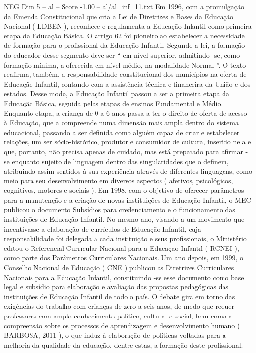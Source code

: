 \begin{textsample}{NEG Dim 5 – al – Score -1.00 – al/al\_inf\_11.txt}
Em 1996, com a promulgação da Emenda Constitucional que cria a Lei de Diretrizes e Bases da Educação Nacional ( LDBEN ), reconhece e regulamenta a Educação Infantil como primeira etapa da Educação Básica.
O artigo 62 foi pioneiro ao estabelecer a necessidade de formação para o profissional da Educação Infantil.
Segundo a lei, a formação do educador desse segmento deve ser “ em nível superior, admitindo -se, como formação mínima, a oferecida em nível médio, na modalidade Normal ”.
O texto reafirma, também, a responsabilidade constitucional dos municípios na oferta de Educação Infantil, contando com a assistência técnica e financeira da União e dos estados.
Desse modo, a Educação Infantil passou a ser a primeira etapa da Educação Básica, seguida pelas etapas de ensinos Fundamental e Médio.
Enquanto etapa, a criança de 0 a 6 anos passa a ter o direito de oferta de acesso à Educação, que a compreende numa dimensão mais ampla dentro do sistema educacional, passando a ser definida como alguém capaz de criar e estabelecer relações, um ser sócio-histórico, produtor e consumidor de cultura, inserido nela e que, portanto, não precisa apenas de cuidado, mas está preparado para afirmar -se enquanto sujeito de linguagem dentro das singularidades que o definem, atribuindo assim sentidos à sua experiência através de diferentes linguagens, como meio para seu desenvolvimento em diversos aspectos ( afetivos, psicológicos, cognitivos, motores e sociais ).
Em 1998, com o objetivo de oferecer parâmetros para a manutenção e a criação de novas instituições de Educação Infantil, o MEC publicou o documento Subsídios para credenciamento e o funcionamento das instituições de Educação Infantil.
No mesmo ano, visando a um movimento que incentivasse a elaboração de currículos de Educação Infantil, cuja responsabilidade foi delegada a cada instituição e seus profissionais, o Ministério editou o Referencial Curricular Nacional para a Educação Infantil ( RCNEI ), como parte dos Parâmetros Curriculares Nacionais.
Um ano depois, em 1999, o Conselho Nacional de Educação ( CNE ) publicou as Diretrizes Curriculares Nacionais para a Educação Infantil, constituindo -se esse documento como base legal e subsídio para elaboração e avaliação das propostas pedagógicas das instituições de Educação Infantil de todo o país.
O debate gira em torno das exigências do trabalho com crianças de zero a seis anos, de modo que requer professores com amplo conhecimento político, cultural e social, bem como a compreensão sobre os processos de aprendizagem e desenvolvimento humano ( BARBOSA, 2011 ), o que induz à elaboração de políticas voltadas para a melhoria da qualidade da educação, dentre estas, a formação deste profissional.

\end{textsample}
